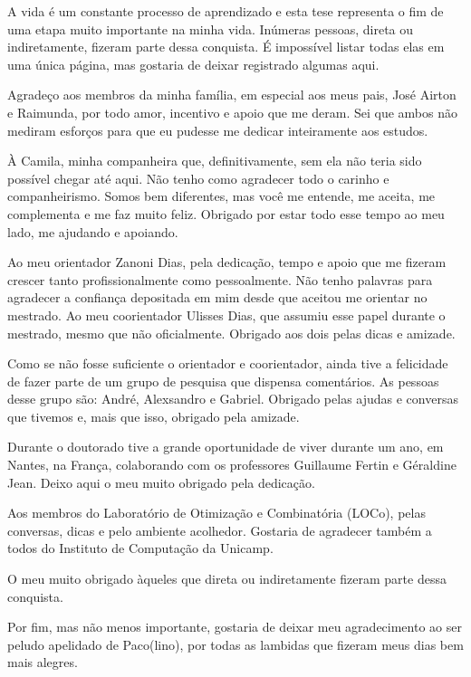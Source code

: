 \documentclass[Portugues,Final]{ic-tese-v3}
\theoremstyle{definition}
\theoremstyle{remark}
\theoremstyle{definition}
\begin{document}

A vida é um constante processo de aprendizado e esta tese representa o fim de uma etapa muito importante na minha vida. Inúmeras pessoas, direta ou indiretamente, fizeram parte dessa conquista. É impossível listar todas elas em uma única página, mas gostaria de deixar registrado algumas aqui. 

Agradeço aos membros da minha família, em especial aos meus pais, José Airton e Raimunda, por todo amor, incentivo e apoio que me deram. Sei que ambos não mediram esforços para que eu pudesse me dedicar inteiramente aos estudos. 

À Camila, minha companheira que, definitivamente, sem ela não teria sido possível chegar até aqui. Não tenho como agradecer todo o carinho e companheirismo. Somos bem diferentes, mas você me entende, me aceita, me complementa e me faz muito feliz. Obrigado por estar todo esse tempo ao meu lado, me ajudando e apoiando.  

Ao meu orientador Zanoni Dias, pela dedicação, tempo e apoio que me fizeram crescer tanto profissionalmente como pessoalmente. Não tenho palavras para agradecer a confiança depositada em mim desde que aceitou me orientar no mestrado. Ao meu coorientador Ulisses Dias, que assumiu esse papel durante o mestrado, mesmo que não oficialmente. Obrigado aos dois pelas dicas e amizade.

Como se não fosse suficiente o orientador e coorientador, ainda tive a felicidade de fazer parte de um grupo de pesquisa que dispensa comentários. As pessoas desse grupo são: André, Alexsandro e Gabriel. Obrigado pelas ajudas e conversas que tivemos e, mais que isso, obrigado pela amizade.

Durante o doutorado tive a grande oportunidade de viver durante um ano, em Nantes, na França, colaborando com os professores Guillaume Fertin e Géraldine Jean. Deixo aqui o meu muito obrigado pela dedicação.

Aos membros do Laboratório de Otimização e Combinatória (LOCo), pelas conversas, dicas e pelo ambiente acolhedor. Gostaria de agradecer também a todos do Instituto de Computação da Unicamp.

O meu muito obrigado àqueles que direta ou indiretamente fizeram parte dessa conquista.

Por fim, mas não menos importante, gostaria de deixar meu agradecimento ao ser peludo apelidado de Paco(lino), por todas as lambidas que fizeram meus dias bem mais alegres.
\end{document}
